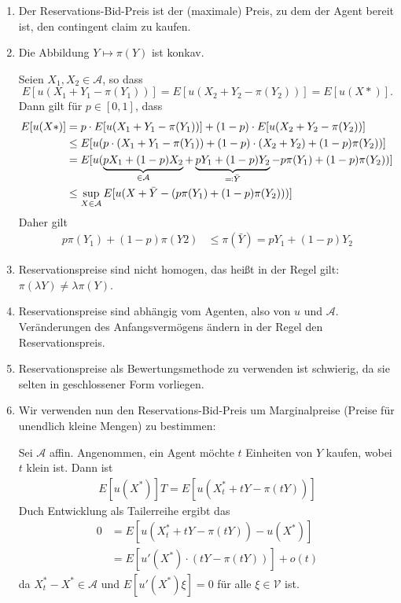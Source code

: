 \documentclass[a4paper,twoside,DIV15,BCOR12mm]{scrbook}
\newcommand{\cA}{\mathcal A}
\newcommand{\cV}{\mathcal V}
\begin{document}
\begin{bemerkung}
\begin{enumerate}
\item Der Reservations-Bid-Preis ist der (maximale) Preis, zu dem der Agent bereit ist, den contingent claim zu kaufen.
\item Die Abbildung $Y\mapsto\pi(Y)$ ist konkav.
\begin{beweis}
Seien $X_1,X_2\in\cA$, so dass
\[E[u(X_1 + Y_1 - \pi(Y_1))] = E[u(X_2+Y_2-\pi(Y_2))] = E[u(X*)].\]
Dann gilt für $p\in[0,1]$, dass
\begin{align*}
E[u(X*)] &= p\cdot E[u(X_1+Y_1-\pi(Y_1))] + (1-p)\cdot E[u(X_2+Y_2-\pi(Y_2))]\\
&\le E[u(p\cdot(X_1+Y_1-\pi(Y_1)) + (1-p)\cdot(X_2+Y_2) + (1-p)\pi(Y_2))] \\
&= E[u(\underbrace{p X_1 + (1-p) X_2}_{\in\cA} + \underbrace{p Y_1 + (1-p)Y_2}_{\ad \bar Y} - p \pi(Y_1) + (1-p) \pi(Y_2))] \\
&\le \sup_{X\in\cA} E[u(X + \bar Y - (p\pi(Y_1) + (1-p) \pi(Y_2)))]
\end{align*}
Daher gilt
\begin{align*}
p\pi(Y_1)+ (1-p)\pi(Y2) &\le \pi(\bar Y) = p Y_1 + (1-p)Y_2
\end{align*}
\end{beweis}

\item Reservationspreise sind nicht homogen, das heißt in der Regel gilt: $\pi(\lambda Y) \ne \lambda \pi(Y)$.
\item Reservationspreise sind abhängig vom Agenten, also von $u$ und $\cA$. Veränderungen des Anfangsvermögens ändern in der Regel den Reservationspreis.
\item Reservationspreise als Bewertungsmethode zu verwenden ist schwierig, da sie selten in geschlossener Form vorliegen.
\item Wir verwenden nun den Reservations-Bid-Preis um Marginalpreise (Preise für unendlich kleine Mengen) zu bestimmen:

Sei $\cA$ affin. Angenommen, ein Agent möchte $t$ Einheiten von $Y$ kaufen, wobei $t$ klein ist. Dann ist 
\begin{align*}
E[u(X^*)]T=E[u(X_t^* + tY - \pi(tY))]
\end{align*}
Duch Entwicklung als Tailerreihe ergibt das
\begin{align*}
0
&= E[u(X_t^* + tY -\pi(tY)) - u(X^*)] \\
&= E[u'(X^*) \cdot (tY - \pi(tY))] + o(t)
\end{align*}
da $X_t^* - X^*\in\cA$ und $E[u'(X^*)\xi]=0$ für alle $\xi\in\cV$ ist.


\end{enumerate}
\end{bemerkung}
\end{document}
